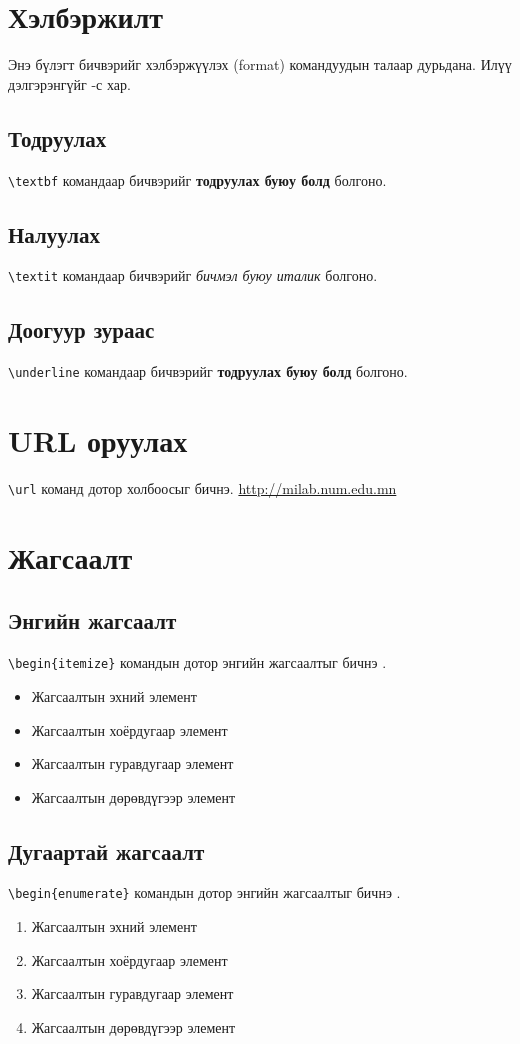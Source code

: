 \documentclass[12pt,A4]{report}
\begin{document}
\section{Хэлбэржилт}
Энэ бүлэгт бичвэрийг хэлбэржүүлэх (format) командуудын талаар дурьдана. Илүү дэлгэрэнгүйг \cite{format1}-с хар.

\subsection{Тодруулах}
\texttt{\textbackslash textbf} командаар бичвэрийг \textbf{тодруулах буюу болд} болгоно.

\subsection{Налуулах}
\texttt{\textbackslash textit} командаар бичвэрийг \textit{бичмэл буюу италик} болгоно.

\subsection{Доогуур зураас}
\texttt{\textbackslash underline} командаар бичвэрийг \textbf{тодруулах буюу болд} болгоно.

\section{URL оруулах}
\texttt{\textbackslash url} команд дотор холбоосыг бичнэ. \url{http://milab.num.edu.mn}


\section{Жагсаалт}
\subsection{Энгийн жагсаалт}
\texttt{\textbackslash begin\{itemize\}} командын дотор энгийн жагсаалтыг бичнэ \cite{list}.
\begin{itemize}
	\item Жагсаалтын эхний элемент
	\item Жагсаалтын хоёрдугаар элемент
	\item Жагсаалтын гуравдугаар элемент
	\item Жагсаалтын дөрөвдүгээр элемент
\end{itemize}

\subsection{Дугаартай жагсаалт}
\texttt{\textbackslash begin\{enumerate\}} командын дотор энгийн жагсаалтыг бичнэ \cite{list}.
\begin{enumerate}
	\item Жагсаалтын эхний элемент
	\item Жагсаалтын хоёрдугаар элемент
	\item Жагсаалтын гуравдугаар элемент
	\item Жагсаалтын дөрөвдүгээр элемент
\end{enumerate}
\end{document}
